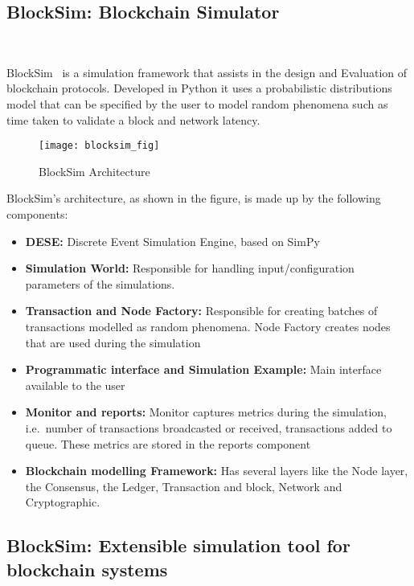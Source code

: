 \subsection{BlockSim: Blockchain Simulator}~\label{subsec:blocksim1}

BlockSim~\cite{blocksim1} is a simulation framework that assists in the design and Evaluation
of blockchain protocols. Developed in Python it uses a probabilistic distributions model that
can be specified by the user to model random phenomena such as time taken to validate a block and
network latency.

\begin{figure}[h]
	\centering
	\texttt{[image: blocksim\_fig]}
	\caption{BlockSim Architecture~\cite{blocksim1}}
	\label{fig:blocksim_fig}
\end{figure}

BlockSim's architecture, as shown in the figure, is made up by the following components:

\begin{itemize}
  \item \textbf{DESE:} Discrete Event Simulation Engine, based on SimPy
  \item \textbf{Simulation World:} Responsible for handling input/configuration parameters
  of the simulations.
  \item \textbf{Transaction and Node Factory:} Responsible for creating batches of 
  transactions modelled as random phenomena. Node Factory creates nodes that are used 
  during the simulation
  \item \textbf{Programmatic interface and Simulation Example:} Main interface available to 
  the user
  \item \textbf{Monitor and reports:} Monitor captures metrics during the simulation, 
  i.e.\ number of transactions broadcasted or received, transactions added to queue. 
  These metrics are stored in the reports component
  \item \textbf{Blockchain modelling Framework:} Has several layers like the Node layer,
  the Consensus, the Ledger, Transaction and block, Network and Cryptographic.
\end{itemize}

\subsection{BlockSim: Extensible simulation tool for blockchain systems}~\label{subsec:blocksim2}

